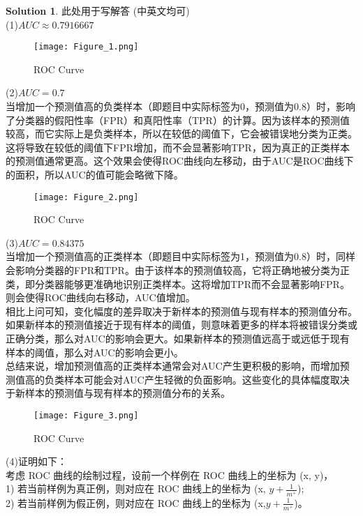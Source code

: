 \documentclass[a4paper,UTF8]{article}
\numberwithin{equation}{section}
\theoremstyle{definition}
\newtheorem*{solution}{Solution}
\begin{document}
\begin{solution}
    此处用于写解答 (中英文均可)
    ~\\
    (1)$AUC \approx 0.7916667$
\begin{figure}[H]
    \centering
    \texttt{[image: Figure\_1.png]}\\
    \caption{ROC Curve}
    \label{fig:roc_drawing}
\end{figure}
(2)$AUC = 0.7$\\
当增加一个预测值高的负类样本（即题目中实际标签为0，预测值为0.8）时，影响了分类器的假阳性率（FPR）和真阳性率（TPR）的计算。因为该样本的预测值较高，而它实际上是负类样本，所以在较低的阈值下，它会被错误地分类为正类。这将导致在较低的阈值下FPR增加，而不会显著影响TPR，因为真正的正类样本的预测值通常更高。这个效果会使得ROC曲线向左移动，由于AUC是ROC曲线下的面积，所以AUC的值可能会略微下降。
\begin{figure}[H]
    \centering
    \texttt{[image: Figure\_2.png]}\\
    \caption{ROC Curve}
    \label{fig:roc_drawing}
\end{figure}
(3)$AUC = 0.84375$\\
当增加一个预测值高的正类样本（即题目中实际标签为1，预测值为0.8）时，同样会影响分类器的FPR和TPR。由于该样本的预测值较高，它将正确地被分类为正类，即分类器能够更准确地识别正类样本。这将增加TPR而不会显著影响FPR。则会使得ROC曲线向右移动，AUC值增加。\\
相比上问可知，变化幅度的差异取决于新样本的预测值与现有样本的预测值分布。如果新样本的预测值接近于现有样本的阈值，则意味着更多的样本将被错误分类或正确分类，那么对AUC的影响会更大。如果新样本的预测值远高于或远低于现有样本的阈值，那么对AUC的影响会更小。\\
总结来说，增加预测值高的正类样本通常会对AUC产生更积极的影响，而增加预测值高的负类样本可能会对AUC产生轻微的负面影响。这些变化的具体幅度取决于新样本的预测值与现有样本的预测值分布的关系。
\begin{figure}[H]
    \centering
    \texttt{[image: Figure\_3.png]}\\
    \caption{ROC Curve}
    \label{fig:roc_drawing}
\end{figure}
    (4)证明如下：\\
考虑 ROC 曲线的绘制过程，设前一个样例在 ROC 曲线上的坐标为 (x, y)，\\
1) 若当前样例为真正例，则对应在 ROC 曲线上的坐标为 (x, $y+\frac{1}{m^{+}}$);\\
2) 若当前样例为假正例，则对应在 ROC 曲线上的坐标为 (x,$y+\frac{1}{m^{+}}$)。\\

\end{solution}
\end{document}
